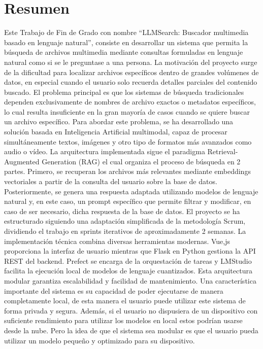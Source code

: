 \chapter{Resumen}
\label{resumen}

Este Trabajo de Fin de Grado con nombre “LLMSearch: Buscador multimedia basado en lenguaje natural”, consiste en desarrollar un sistema que permita la búsqueda de archivos multimedia mediante consultas formuladas en lenguaje natural como si se le preguntase a una persona. La motivación del proyecto surge de la dificultad para localizar archivos específicos dentro de grandes volúmenes de datos, en especial cuando el usuario solo recuerda detalles parciales del contenido buscado.
El problema principal es que los sistemas de búsqueda tradicionales dependen exclusivamente de nombres de archivo exactos o metadatos específicos, lo cual resulta insuficiente en la gran mayoría de casos cuando se quiere buscar un archivo específico.
Para abordar este problema, se ha desarrollado una solución basada en Inteligencia Artificial multimodal, capaz de procesar simultáneamente textos, imágenes y otro tipo de formatos más avanzados como audio o vídeo.
La arquitectura implementada sigue el paradigma Retrieval-Augmented Generation (RAG) el cual organiza el proceso de búsqueda en 2 partes. Primero, se recuperan los archivos más relevantes mediante embeddings vectoriales a partir de la consulta del usuario sobre la base de datos. Posteriormente, se genera una respuesta adaptada utilizando modelos de lenguaje natural y, en este caso, un prompt específico que permite filtrar y modificar, en caso de ser necesario, dicha respuesta de la base de datos.
El proyecto se ha estructurado siguiendo una adaptación simplificada de la metodología Scrum, dividiendo el trabajo en sprints iterativos de aproximadamente 2 semanas.
La implementación técnica combina diversas herramientas modernas. Vue,js proporciona la interfaz de usuario mientras que Flask en Python gestiona la API REST del backend. Prefect se encarga de la orquestación de tareas y LMStudio facilita la ejecución local de modelos de lenguaje cuantizados. Esta arquitectura modular garantiza escalabilidad y facilidad de mantenimiento.
Una característica importante del sistema es su capacidad de poder ejecutarse de manera completamente local, de esta manera el usuario puede utilizar este sistema de forma privada y segura. Además, si el usuario no dispusiera de un dispositivo con suficiente rendimiento para utilizar los modelos en local estos podrían usarse desde la nube. Pero la idea de que el sistema sea modular es que el usuario pueda utilizar un modelo pequeño y optimizado para su dispositivo.
